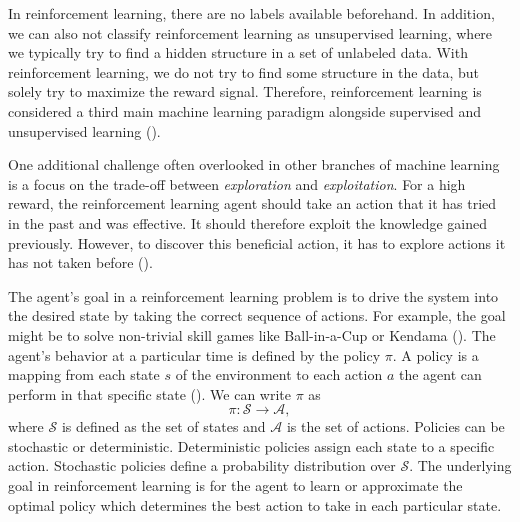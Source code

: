 In reinforcement learning, there are no labels available beforehand. In addition, we can also not classify reinforcement learning as unsupervised learning, where we typically try to find a hidden structure in a set of unlabeled data. With reinforcement learning, we do not try to find some structure in the data, but solely try to maximize the reward signal. Therefore, reinforcement learning is considered a third main machine learning paradigm alongside supervised and unsupervised learning (\cite{sutton2018reinforcement}).

One additional challenge often overlooked in other branches of machine learning is a focus on the trade-off between \textit{exploration} and \textit{exploitation}. For a high reward, the reinforcement learning agent should take an action that it has tried in the past and was effective. It should therefore exploit the knowledge gained previously. However, to discover this beneficial action, it has to explore actions it has not taken before (\cite{sutton2018reinforcement}).

The agent's goal in a reinforcement learning problem is to drive the system into the desired state by taking the correct sequence of actions. For example, the goal might be to solve non-trivial skill games like Ball-in-a-Cup or Kendama (\cite{kober2010imitation}). The agent's behavior at a particular time is defined by the policy $\pi$. A policy is a mapping from each state $s$ of the environment to each action $a$ the agent can perform in that specific state (\cite{sutton2018reinforcement}). We can write $\pi$ as
\begin{equation*}
  \pi : \mathcal{S} \rightarrow \mathcal{A},
\end{equation*}
where $\mathcal{S}$ is defined as the set of states and $\mathcal{A}$ is the set of actions. Policies can be stochastic or deterministic. Deterministic policies assign each state to a specific action. Stochastic policies define a probability distribution over $\mathcal S$. The underlying goal in reinforcement learning is for the agent to learn or approximate the optimal policy which determines the best action to take in each particular state.


